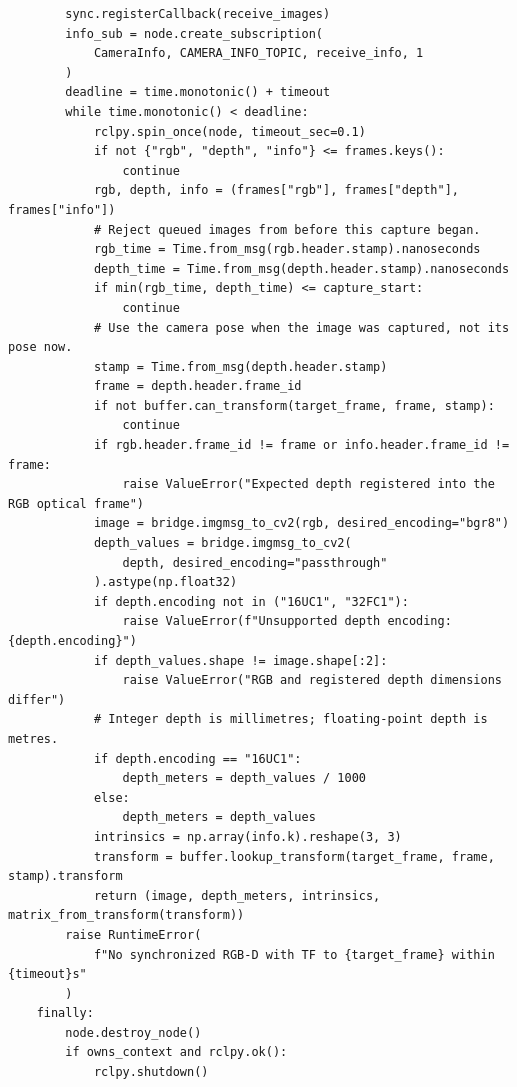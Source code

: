 \documentclass[11pt,a4paper]{book}
\begin{document}
\begin{lstlisting}
        sync.registerCallback(receive_images)
        info_sub = node.create_subscription(
            CameraInfo, CAMERA_INFO_TOPIC, receive_info, 1
        )
        deadline = time.monotonic() + timeout
        while time.monotonic() < deadline:
            rclpy.spin_once(node, timeout_sec=0.1)
            if not {"rgb", "depth", "info"} <= frames.keys():
                continue
            rgb, depth, info = (frames["rgb"], frames["depth"], frames["info"])
            # Reject queued images from before this capture began.
            rgb_time = Time.from_msg(rgb.header.stamp).nanoseconds
            depth_time = Time.from_msg(depth.header.stamp).nanoseconds
            if min(rgb_time, depth_time) <= capture_start:
                continue
            # Use the camera pose when the image was captured, not its pose now.
            stamp = Time.from_msg(depth.header.stamp)
            frame = depth.header.frame_id
            if not buffer.can_transform(target_frame, frame, stamp):
                continue
            if rgb.header.frame_id != frame or info.header.frame_id != frame:
                raise ValueError("Expected depth registered into the RGB optical frame")
            image = bridge.imgmsg_to_cv2(rgb, desired_encoding="bgr8")
            depth_values = bridge.imgmsg_to_cv2(
                depth, desired_encoding="passthrough"
            ).astype(np.float32)
            if depth.encoding not in ("16UC1", "32FC1"):
                raise ValueError(f"Unsupported depth encoding: {depth.encoding}")
            if depth_values.shape != image.shape[:2]:
                raise ValueError("RGB and registered depth dimensions differ")
            # Integer depth is millimetres; floating-point depth is metres.
            if depth.encoding == "16UC1":
                depth_meters = depth_values / 1000
            else:
                depth_meters = depth_values
            intrinsics = np.array(info.k).reshape(3, 3)
            transform = buffer.lookup_transform(target_frame, frame, stamp).transform
            return (image, depth_meters, intrinsics, matrix_from_transform(transform))
        raise RuntimeError(
            f"No synchronized RGB-D with TF to {target_frame} within {timeout}s"
        )
    finally:
        node.destroy_node()
        if owns_context and rclpy.ok():
            rclpy.shutdown()
\end{lstlisting}
\end{document}
